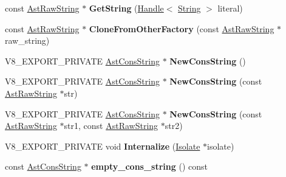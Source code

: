 \begin{DoxyCompactItemize}
\item 
\mbox{\label{classv8_1_1internal_1_1AstValueFactory_aaf364273b48895f490ec1008ecd29bed}} 
const \mbox{\hyperlink{classv8_1_1internal_1_1AstRawString}{Ast\+Raw\+String}} $\ast$ {\bfseries Get\+String} (\mbox{\hyperlink{classv8_1_1internal_1_1Handle}{Handle}}$<$ \mbox{\hyperlink{classv8_1_1internal_1_1String}{String}} $>$ literal)
\item 
\mbox{\label{classv8_1_1internal_1_1AstValueFactory_aa147f26dd9949b3cb9f4af9b0204b492}} 
const \mbox{\hyperlink{classv8_1_1internal_1_1AstRawString}{Ast\+Raw\+String}} $\ast$ {\bfseries Clone\+From\+Other\+Factory} (const \mbox{\hyperlink{classv8_1_1internal_1_1AstRawString}{Ast\+Raw\+String}} $\ast$raw\+\_\+string)
\item 
\mbox{\label{classv8_1_1internal_1_1AstValueFactory_afda27d98804f5ae8291356534c51275d}} 
V8\+\_\+\+E\+X\+P\+O\+R\+T\+\_\+\+P\+R\+I\+V\+A\+TE \mbox{\hyperlink{classv8_1_1internal_1_1AstConsString}{Ast\+Cons\+String}} $\ast$ {\bfseries New\+Cons\+String} ()
\item 
\mbox{\label{classv8_1_1internal_1_1AstValueFactory_a702b7ff96fbf11dc226958d968691c17}} 
V8\+\_\+\+E\+X\+P\+O\+R\+T\+\_\+\+P\+R\+I\+V\+A\+TE \mbox{\hyperlink{classv8_1_1internal_1_1AstConsString}{Ast\+Cons\+String}} $\ast$ {\bfseries New\+Cons\+String} (const \mbox{\hyperlink{classv8_1_1internal_1_1AstRawString}{Ast\+Raw\+String}} $\ast$str)
\item 
\mbox{\label{classv8_1_1internal_1_1AstValueFactory_a1b8064ab42991e3bf3e3f2980636b5da}} 
V8\+\_\+\+E\+X\+P\+O\+R\+T\+\_\+\+P\+R\+I\+V\+A\+TE \mbox{\hyperlink{classv8_1_1internal_1_1AstConsString}{Ast\+Cons\+String}} $\ast$ {\bfseries New\+Cons\+String} (const \mbox{\hyperlink{classv8_1_1internal_1_1AstRawString}{Ast\+Raw\+String}} $\ast$str1, const \mbox{\hyperlink{classv8_1_1internal_1_1AstRawString}{Ast\+Raw\+String}} $\ast$str2)
\item 
\mbox{\label{classv8_1_1internal_1_1AstValueFactory_a5deb8e954fe78ec1910d5fe494e602d3}} 
V8\+\_\+\+E\+X\+P\+O\+R\+T\+\_\+\+P\+R\+I\+V\+A\+TE void {\bfseries Internalize} (\mbox{\hyperlink{classv8_1_1internal_1_1Isolate}{Isolate}} $\ast$isolate)
\item 
\mbox{\label{classv8_1_1internal_1_1AstValueFactory_a7b9c65cc2e04eee0ea3fdbd46328a918}} 
const \mbox{\hyperlink{classv8_1_1internal_1_1AstConsString}{Ast\+Cons\+String}} $\ast$ {\bfseries empty\+\_\+cons\+\_\+string} () const
\end{DoxyCompactItemize}


